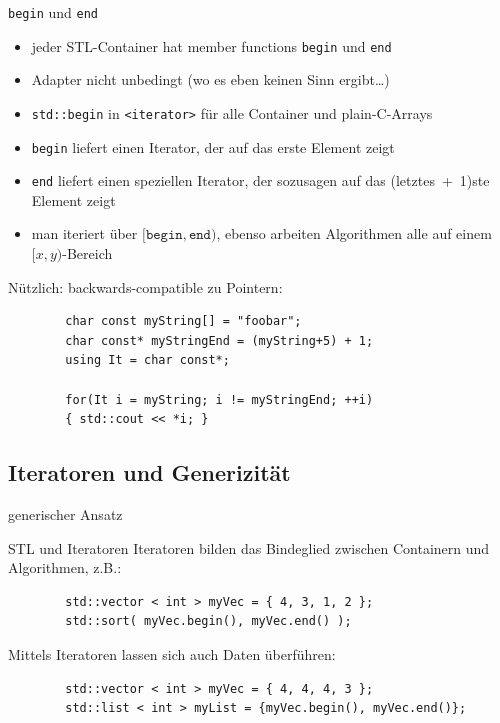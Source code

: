 \begin{frame}[fragile]{\texttt{begin} und \texttt{end}}
	\begin{itemize}
		\item jeder STL-Container hat member functions \texttt{begin} und \texttt{end}
		\item Adapter nicht unbedingt (wo es eben keinen Sinn ergibt\dots)
		\item \texttt{std::begin} in \texttt{<iterator>} für alle Container und plain-C-Arrays
		\item \texttt{begin} liefert einen Iterator, der auf das erste Element zeigt
		\item \texttt{end} liefert einen speziellen Iterator, der sozusagen auf das (letztes~+~1)ste Element zeigt
		\item man iteriert über $[\texttt{begin}, \texttt{end})$, ebenso arbeiten Algorithmen alle auf einem $[x, y)$-Bereich
	\end{itemize}
	
	\pause
	\vspace{1em}
	
	Nützlich: backwards-compatible zu Pointern:
	\begin{lstlisting}
		char const myString[] = "foobar";
		char const* myStringEnd = (myString+5) + 1;
		using It = char const*;
		
		for(It i = myString; i != myStringEnd; ++i)
		{ std::cout << *i; }
	\end{lstlisting}
\end{frame}


\subsection{Iteratoren und Generizität}

\begin{frame}[t]{generischer Ansatz}
	\onslide*<+> {  }
	\onslide<+-> {  }
\end{frame}

\begin{frame}{STL und Iteratoren}
	Iteratoren bilden das Bindeglied zwischen Containern und Algorithmen, z.B.:
	\begin{lstlisting}
		std::vector < int > myVec = { 4, 3, 1, 2 };
		std::sort( myVec.begin(), myVec.end() );
	\end{lstlisting}
	
	\pause
	Mittels Iteratoren lassen sich auch Daten überführen:
	
	\begin{lstlisting}
		std::vector < int > myVec = { 4, 4, 4, 3 };
		std::list < int > myList = {myVec.begin(), myVec.end()};
	\end{lstlisting}
\end{frame}


